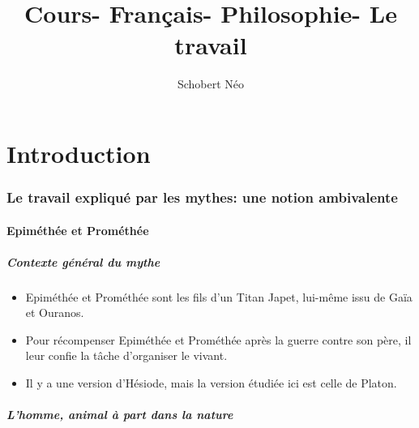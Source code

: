 \documentclass[a4paper, 11pt, hidelinks]{article}
\begin{document}
\newcommand{\grad}[1]{\vv{grad}#1}


\title{Cours- Français- Philosophie- Le travail}
\author{Schobert Néo}

\maketitle

\tableofcontents


\newpage

\part{Introduction}


\section{Le travail expliqué par les mythes: une notion ambivalente}

\subsection{Epiméthée et Prométhée}

\subsubsection{Contexte général du mythe}

\begin{itemize}
    \item Epiméthée et Prométhée sont les fils d'un Titan Japet, lui-même issu de Gaïa et Ouranos.
    \item Pour récompenser Epiméthée et Prométhée après la guerre contre son père, il leur confie la tâche d'organiser le vivant.
    \item Il y a une version d'Hésiode, mais la version étudiée ici est celle de Platon.
\end{itemize}




\subsubsection{L'homme, animal à part dans la nature}
\end{document}
